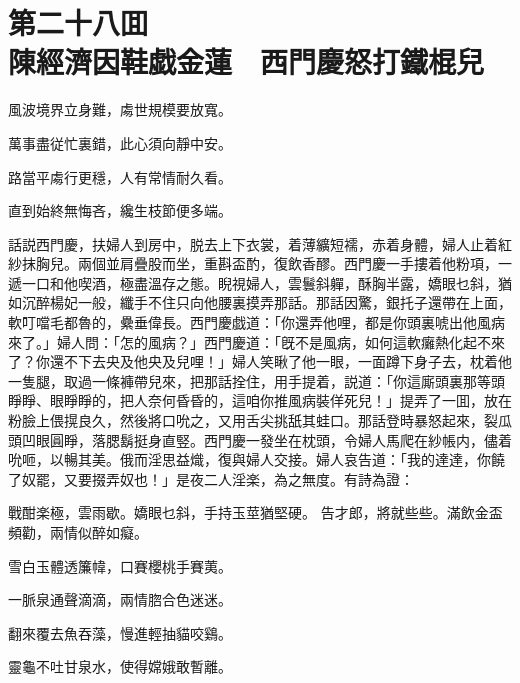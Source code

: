 
\chapter*{第二十八囬　\\陳經濟因鞋戯金蓮　西門慶怒打鐵棍兒}


\begin{myquote}
風波境界立身難，䖏世規模要放寬。

萬事盡従忙裏錯，此心須向靜中安。

路當平䖏行更穩，人有常情耐久看。

直到始終無悔吝，纔生枝節便多端。
\end{myquote}

話説西門慶，扶婦人到房中，脱去上下衣裳，着薄纊短襦，赤着身體，婦人止着紅紗抹胸兒。兩個並肩疊股而坐，重斟盃酌，復飲香醪。西門慶一手摟着他粉項，一遞一口和他喫酒，極盡溫存之態。睨視婦人，雲鬟斜軃，酥胸半露，嬌眼乜斜，猶如沉醉楊妃一般，纖手不住只向他腰裏摸弄那話。那話因驚，銀托子還帶在上面，軟叮噹毛都魯的，纍垂偉長。西門慶戯道：「你還弄他哩，都是你頭裏唬出他風病來了。」婦人問：「怎的風病？」西門慶道：「旣不是風病，如何這軟癱熱化起不來了？你還不下去央及他央及兒哩！」婦人笑瞅了他一眼，一面蹲下身子去，枕着他一隻腿，取過一條褲帶兒來，把那話拴住，用手提着，説道：「你這廝頭裏那等頭睜睜、眼睜睜的，把人奈何昏昏的，這咱你推風病裝佯死兒！」提弄了一囬，放在粉臉上偎㨪良久，然後將口吮之，又用舌尖挑舐其蛙口。那話登時暴怒起來，裂瓜頭凹眼圓睜，落腮鬍挺身直竪。西門慶一發坐在枕頭，令婦人馬爬在紗帳内，儘着吮咂，以暢其美。俄而淫思益熾，復與婦人交接。婦人哀告道：「我的達達，你饒了奴罷，又要掇弄奴也！」是夜二人淫楽，為之無度。有詩為證：

\begin{myquote}
戰酣楽極，雲雨歇。嬌眼乜斜，手持玉莖猶堅硬。
告才郎，將就些些。滿飲金盃頻勸，兩情似醉如癡。
\end{myquote}

\begin{myquote}
雪白玉體透簾幃，口賽櫻桃手賽荑。

一脈泉通聲滴滴，兩情脗合色迷迷。

翻來覆去魚吞藻，慢進輕抽貓咬鷄。

靈龜不吐甘泉水，使得嫦娥敢暫離。
\end{myquote}

